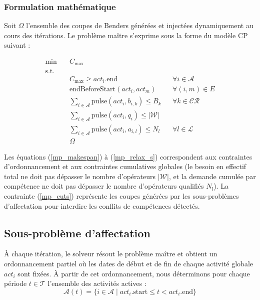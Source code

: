 \subsubsection{Formulation mathématique}
Soit $\Omega$ l'ensemble des coupes de Benders générées et injectées dynamiquement au cours des itérations. Le problème maître s'exprime sous la forme du modèle CP suivant :

\begin{align}
    \min \quad & C_{\max} \label{mp_obj} \\
    \text{s.t.} \quad & \nonumber \\
    & C_{\max} \geq act_i.\text{end} && \forall i \in \mathcal{A} \label{mp_makespan} \\
    & \text{endBeforeStart}(act_i, act_m) && \forall (i,m) \in E \label{mp_prec} \\
    & \sum_{i \in \mathcal{A}} \text{pulse}(act_i, b_{i,k}) \leq B_k && \forall k \in \mathcal{CR} \label{mp_cumul} \\
    & \sum_{i \in \mathcal{A}} \text{pulse}(act_i, q_i) \leq \lvert \mathcal{W} \rvert \label{mp_relax_w} \\
    & \sum_{i \in \mathcal{A}}  \text{pulse}(act_i, a_{i,l}) \leq N_{l} && \forall l \in \mathcal{L} \label{mp_relax_s} \\
    & \Omega \label{mp_cuts}
\end{align}

Les équations (\ref{mp_makespan}) à (\ref{mp_relax_s}) correspondent aux contraintes d'ordonnancement et aux contraintes cumulatives globales (le besoin en effectif total ne doit pas dépasser le nombre d'opérateurs $|\mathcal{W}|$, et la demande cumulée par compétence ne doit pas dépasser le nombre d'opérateurs qualifiés $N_l$). La contrainte (\ref{mp_cuts}) représente les coupes générées par les sous-problèmes d'affectation pour interdire les conflits de compétences détectés.

\subsection{Sous-problème d'affectation}
À chaque itération, le solveur résout le problème maître et obtient un ordonnancement partiel où les dates de début et de fin de chaque activité globale $act_i$ sont fixées. À partir de cet ordonnancement, nous déterminons pour chaque période $t \in \mathcal{T}$ l'ensemble des activités actives :
\begin{equation}
    \mathcal{A}(t) = \{ i \in \mathcal{A} \mid act_i.\text{start} \le t < act_i.\text{end} \}
\end{equation}

